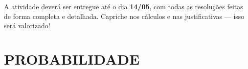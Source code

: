 \documentclass[a4paper]{article}
\begin{document}
	\fontsize{10}{15}\selectfont
	\vspace*{1mm}
	
	\section*{}	
	\begin{tcolorbox}[colback=gray!10, colframe=black, boxrule=0.5mm, arc=4pt, title=\textbf{Orientações}]
		A atividade deverá ser entregue até o dia \textbf{14/05}, com todas as resoluções feitas de forma completa e detalhada. 		
		Capriche nos cálculos e nas justificativas — isso será valorizado!
	\end{tcolorbox}
	
	\section*{PROBABILIDADE} 
				
\end{document}
